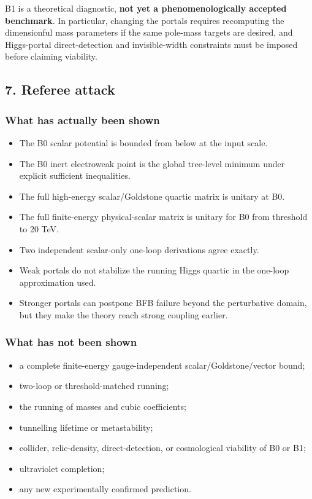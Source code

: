 \documentclass[
]{article}
\providecommand{\tightlist}{%
  \setlength{\itemsep}{0pt}\setlength{\parskip}{0pt}}
\begin{document}
B1 is a theoretical diagnostic, \textbf{not yet a phenomenologically
accepted benchmark}. In particular, changing the portals requires
recomputing the dimensionful mass parameters if the same pole-mass
targets are desired, and Higgs-portal direct-detection and
invisible-width constraints must be imposed before claiming viability.

\hypertarget{referee-attack}{%
\subsection{7. Referee attack}\label{referee-attack}}

\hypertarget{what-has-actually-been-shown}{%
\subsubsection{What has actually been
shown}\label{what-has-actually-been-shown}}

\begin{itemize}
\tightlist
\item
  The B0 scalar potential is bounded from below at the input scale.
\item
  The B0 inert electroweak point is the global tree-level minimum under
  explicit sufficient inequalities.
\item
  The full high-energy scalar/Goldstone quartic matrix is unitary at B0.
\item
  The full finite-energy physical-scalar matrix is unitary for B0 from
  threshold to 20 TeV.
\item
  Two independent scalar-only one-loop derivations agree exactly.
\item
  Weak portals do not stabilize the running Higgs quartic in the
  one-loop approximation used.
\item
  Stronger portals can postpone BFB failure beyond the perturbative
  domain, but they make the theory reach strong coupling earlier.
\end{itemize}

\hypertarget{what-has-not-been-shown}{%
\subsubsection{What has not been shown}\label{what-has-not-been-shown}}

\begin{itemize}
\tightlist
\item
  a complete finite-energy gauge-independent scalar/Goldstone/vector
  bound;
\item
  two-loop or threshold-matched running;
\item
  the running of masses and cubic coefficients;
\item
  tunnelling lifetime or metastability;
\item
  collider, relic-density, direct-detection, or cosmological viability
  of B0 or B1;
\item
  ultraviolet completion;
\item
  any new experimentally confirmed prediction.
\end{itemize}
\end{document}
